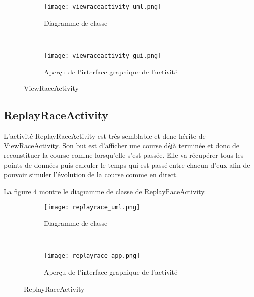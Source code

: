 \begin{figure}[htb!]
    \centering
    \begin{subfigure}[htb]{0.49\textwidth}
		\texttt{[image: viewraceactivity\_uml.png]} 
		\caption{Diagramme de classe}
		\label{fig:viewraceactivity_uml}
    \end{subfigure}
    ~ %
    \begin{subfigure}[htb]{0.49\textwidth}
		\texttt{[image: viewraceactivity\_gui.png]} 
		\caption{Aperçu de l'interface graphique de l'activité}
		\label{fig:viewraceactivity_gui}
    \end{subfigure}
    \caption{ViewRaceActivity}\label{fig:viewraceactivity_fig}
\end{figure}

\subsection{ReplayRaceActivity}

L'activité ReplayRaceActivity est très semblable et donc hérite de ViewRaceActivity. Son but est d'afficher une course déjà terminée et donc de reconstituer la course comme lorsqu'elle s'est passée. Elle va récupérer tous les points de données puis calculer le temps qui est passé entre chacun d'eux afin de pouvoir simuler l'évolution de la course comme en direct.

La figure \ref{fig:replayrace_uml} montre le diagramme de classe de ReplayRaceActivity.

\begin{figure}[htb!]
    \centering
    \begin{subfigure}[htb]{0.49\textwidth}
		\texttt{[image: replayrace\_uml.png]} 
		\caption{Diagramme de classe}
		\label{fig:replayrace_uml}
    \end{subfigure}
    ~ %
    \begin{subfigure}[htb]{0.49\textwidth}
		\texttt{[image: replayrace\_app.png]} 
		\caption{Aperçu de l'interface graphique de l'activité}
		\label{fig:replayrace_gui}
    \end{subfigure}
    \caption{ReplayRaceActivity}\label{fig:replayrace_fig}
\end{figure}

